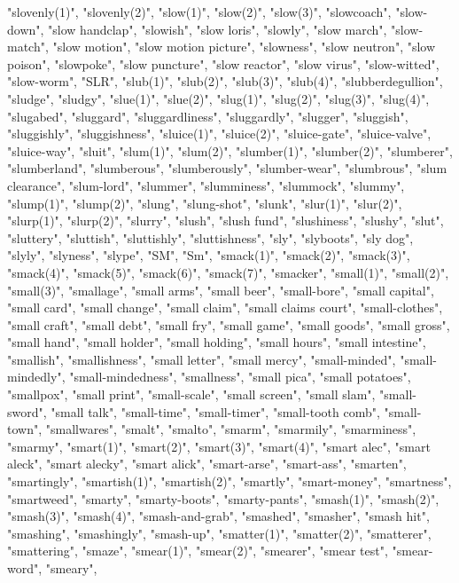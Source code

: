 "slovenly(1)",
"slovenly(2)",
"slow(1)",
"slow(2)",
"slow(3)",
"slowcoach",
"slow-down",
"slow handclap",
"slowish",
"slow loris",
"slowly",
"slow march",
"slow-match",
"slow motion",
"slow motion picture",
"slowness",
"slow neutron",
"slow poison",
"slowpoke",
"slow puncture",
"slow reactor",
"slow virus",
"slow-witted",
"slow-worm",
"SLR",
"slub(1)",
"slub(2)",
"slub(3)",
"slub(4)",
"slubberdegullion",
"sludge",
"sludgy",
"slue(1)",
"slue(2)",
"slug(1)",
"slug(2)",
"slug(3)",
"slug(4)",
"slugabed",
"sluggard",
"sluggardliness",
"sluggardly",
"slugger",
"sluggish",
"sluggishly",
"sluggishness",
"sluice(1)",
"sluice(2)",
"sluice-gate",
"sluice-valve",
"sluice-way",
"sluit",
"slum(1)",
"slum(2)",
"slumber(1)",
"slumber(2)",
"slumberer",
"slumberland",
"slumberous",
"slumberously",
"slumber-wear",
"slumbrous",
"slum clearance",
"slum-lord",
"slummer",
"slumminess",
"slummock",
"slummy",
"slump(1)",
"slump(2)",
"slung",
"slung-shot",
"slunk",
"slur(1)",
"slur(2)",
"slurp(1)",
"slurp(2)",
"slurry",
"slush",
"slush fund",
"slushiness",
"slushy",
"slut",
"sluttery",
"sluttish",
"sluttishly",
"sluttishness",
"sly",
"slyboots",
"sly dog",
"slyly",
"slyness",
"slype",
"SM",
"Sm",
"smack(1)",
"smack(2)",
"smack(3)",
"smack(4)",
"smack(5)",
"smack(6)",
"smack(7)",
"smacker",
"small(1)",
"small(2)",
"small(3)",
"smallage",
"small arms",
"small beer",
"small-bore",
"small capital",
"small card",
"small change",
"small claim",
"small claims court",
"small-clothes",
"small craft",
"small debt",
"small fry",
"small game",
"small goods",
"small gross",
"small hand",
"small holder",
"small holding",
"small hours",
"small intestine",
"smallish",
"smallishness",
"small letter",
"small mercy",
"small-minded",
"small-mindedly",
"small-mindedness",
"smallness",
"small pica",
"small potatoes",
"smallpox",
"small print",
"small-scale",
"small screen",
"small slam",
"small-sword",
"small talk",
"small-time",
"small-timer",
"small-tooth comb",
"small-town",
"smallwares",
"smalt",
"smalto",
"smarm",
"smarmily",
"smarminess",
"smarmy",
"smart(1)",
"smart(2)",
"smart(3)",
"smart(4)",
"smart alec",
"smart aleck",
"smart alecky",
"smart alick",
"smart-arse",
"smart-ass",
"smarten",
"smartingly",
"smartish(1)",
"smartish(2)",
"smartly",
"smart-money",
"smartness",
"smartweed",
"smarty",
"smarty-boots",
"smarty-pants",
"smash(1)",
"smash(2)",
"smash(3)",
"smash(4)",
"smash-and-grab",
"smashed",
"smasher",
"smash hit",
"smashing",
"smashingly",
"smash-up",
"smatter(1)",
"smatter(2)",
"smatterer",
"smattering",
"smaze",
"smear(1)",
"smear(2)",
"smearer",
"smear test",
"smear-word",
"smeary",
